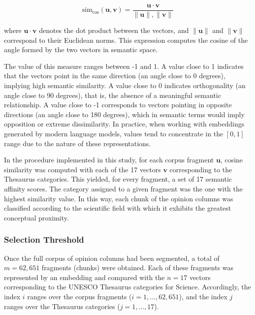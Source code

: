 \documentclass[11pt,a4paper]{article}
\begin{document}
	\begin{equation}
		\text{sim}_{\cos}(\mathbf{u}, \mathbf{v}) =
		\frac{\mathbf{u} \cdot \mathbf{v}}
		{\lVert \mathbf{u} \rVert , \lVert \mathbf{v} \rVert}
	\end{equation}
		
	where $\mathbf{u} \cdot \mathbf{v}$ denotes the dot product between the vectors, and $\lVert \mathbf{u} \rVert$ and $\lVert \mathbf{v} \rVert$ correspond to their Euclidean norms. This expression computes the cosine of the angle formed by the two vectors in semantic space.
	
	The value of this measure ranges between -1 and 1. A value close to 1 indicates that the vectors point in the same direction (an angle close to 0 degrees), implying high semantic similarity. A value close to 0 indicates orthogonality (an angle close to 90 degrees), that is, the absence of a meaningful semantic relationship. A value close to -1 corresponds to vectors pointing in opposite directions (an angle close to 180 degrees), which in semantic terms would imply opposition or extreme dissimilarity. In practice, when working with embeddings generated by modern language models, values tend to concentrate in the $[0,1]$ range due to the nature of these representations.
		
	In the procedure implemented in this study, for each corpus fragment $\mathbf{u}$, cosine similarity was computed with each of the 17 vectors $\mathbf{v}$ corresponding to the Thesaurus categories. This yielded, for every fragment, a set of 17 semantic affinity scores. The category assigned to a given fragment was the one with the highest similarity value. In this way, each chunk of the opinion columns was classified according to the scientific field with which it exhibits the greatest conceptual proximity.
	

	\subsubsection{Selection Threshold}

Once the full corpus of opinion columns had been segmented, a total of $m = 62{,}651$ fragments (chunks) were obtained. Each of these fragments was represented by an embedding and compared with the $n = 17$ vectors corresponding to the UNESCO Thesaurus categories for Science. Accordingly, the index $i$ ranges over the corpus fragments ($i = 1, \dots, 62{,}651$), and the index $j$ ranges over the Thesaurus categories ($j = 1, \dots, 17$).
\end{document}
